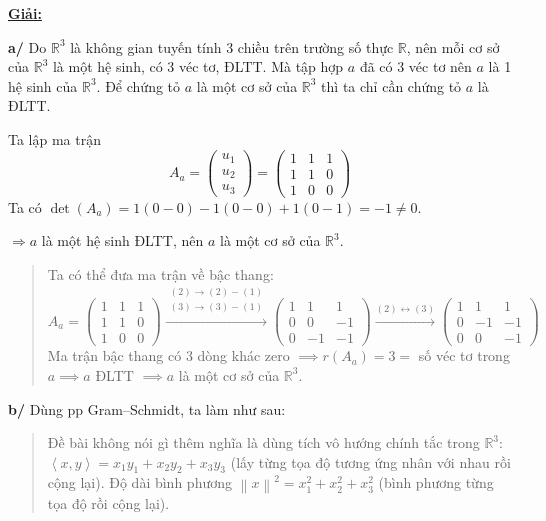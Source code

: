 \documentclass[12pt,a4paper]{article}
\newcommand{\R}{\mathbb{R}}
\newcommand{\ip}[2]{\left\langle #1,#2\right\rangle}
\newcommand{\norm}[1]{\left\|#1\right\|}
\begin{document}
\underline{\textbf{Giải:}}

\textbf{a/} Do $\R^3$ là không gian tuyến tính 3 chiều trên trường số thực $\R$, nên mỗi cơ sở của $\R^3$ là một hệ sinh, có 3 véc tơ, ĐLTT. Mà tập hợp $a$ đã có 3 véc tơ nên $a$ là 1 hệ sinh của $\R^3$. Để chứng tỏ $a$ là một cơ sở của $\R^3$ thì ta chỉ cần chứng tỏ $a$ là ĐLTT.

Ta lập ma trận
\[
A_a = \begin{pmatrix} u_1 \\ u_2 \\ u_3 \end{pmatrix} = \begin{pmatrix} 1 & 1 & 1 \\ 1 & 1 & 0 \\ 1 & 0 & 0 \end{pmatrix}
\]
Ta có $\det(A_a) = 1(0 - 0) - 1(0 - 0) + 1(0 - 1) = -1 \neq 0$.

$\Rightarrow a$ là một hệ sinh ĐLTT, nên $a$ là một cơ sở của $\R^3$.

\begin{quote}
\small
\noindent{}\par\vspace{3pt}
Ta có thể đưa ma trận về bậc thang:
\[
A_a = \begin{pmatrix} 1 & 1 & 1 \\ 1 & 1 & 0 \\ 1 & 0 & 0 \end{pmatrix} \xrightarrow{\substack{(2) \to (2) - (1) \\ (3) \to (3) - (1)}} \begin{pmatrix} 1 & 1 & 1 \\ 0 & 0 & -1 \\ 0 & -1 & -1 \end{pmatrix} \xrightarrow{(2) \leftrightarrow (3)} \begin{pmatrix} 1 & 1 & 1 \\ 0 & -1 & -1 \\ 0 & 0 & -1 \end{pmatrix}
\]
Ma trận bậc thang có 3 dòng khác zero $\implies r(A_a) = 3 =$ số véc tơ trong $a \implies a$ ĐLTT $\implies a$ là một cơ sở của $\R^3$.
\end{quote}

\vspace{0.2cm}
\textbf{b/} Dùng pp Gram--Schmidt, ta làm như sau:

\begin{quote}
\small
\noindent{}\par\vspace{3pt}
Đề bài không nói gì thêm nghĩa là dùng tích vô hướng chính tắc trong $\R^3$: $\ip{x}{y} = x_1y_1 + x_2y_2 + x_3y_3$ (lấy từng tọa độ tương ứng nhân với nhau rồi cộng lại). Độ dài bình phương $\norm{x}^2 = x_1^2 + x_2^2 + x_3^2$ (bình phương từng tọa độ rồi cộng lại).
\end{quote}
\end{document}
